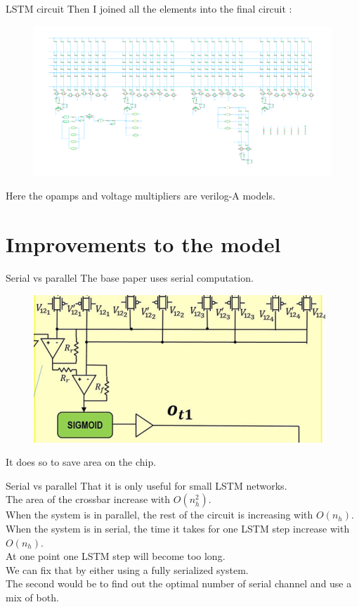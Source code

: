 \documentclass{beamer}
\begin{document}
  \begin{frame}{LSTM circuit}
    Then I joined all the elements into the final circuit :
    \begin{figure}
      \centering
      \includegraphics[height=0.5\textheight]{lstm/lstm-np}
    \end{figure}
    Here the opamps and voltage multipliers are verilog-A models.
  \end{frame}



  \section{Improvements to the model}
  \begin{frame}{Serial vs parallel}
    The base paper uses serial computation.
    \begin{figure}
      \centering
      \includegraphics[height=0.5\textheight]{parallel.png}
    \end{figure}
    It does so to save area on the chip.
  \end{frame}
  \begin{frame}{Serial vs parallel}
    That it is only useful for small LSTM networks.\\
    The area of the crossbar increase with $O(n_h^2)$.\\
    When the system is in parallel, the rest of the circuit is increasing with $O(n_h)$.\\
    When the system is in serial, the time it takes for one LSTM step increase with $O(n_h)$.\\
    At one point one LSTM step will become too long.\\
    We can fix that by either using a fully serialized system.\\
    The second would be to find out the optimal number of serial channel and use a mix of both.
  \end{frame}
\end{document}
